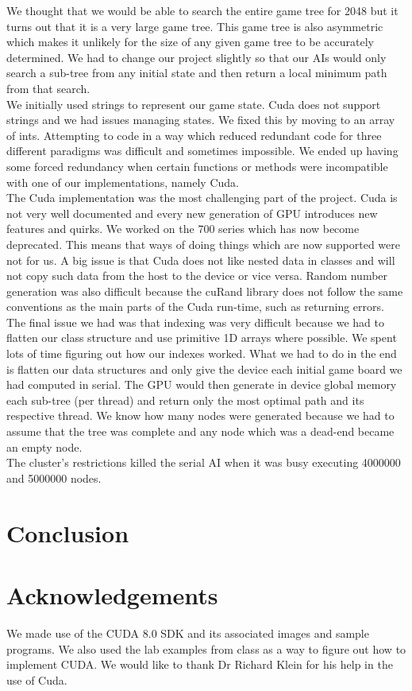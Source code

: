 \documentclass[a4paper]{report}
\begin{document}
We thought that we would be able to search the entire game tree for 2048 but it turns out that it is a very large game tree. This game tree is also asymmetric which makes it unlikely for the size of any given game tree to be accurately determined. We had to change our project slightly so that our AIs would only search a sub-tree from any initial state and then return a local minimum path from that search.\\

We initially used strings to represent our game state. Cuda does not support strings and we had issues managing states. We fixed this by moving to an array of ints.
Attempting to code in a way which reduced redundant code for three different paradigms was difficult and sometimes impossible. We ended up having some forced redundancy when certain functions or methods were incompatible with one of our implementations, namely Cuda.\\

The Cuda implementation was the most challenging part of the project. Cuda is not very well documented and every new generation of GPU introduces new features and quirks. We worked on the 700 series which has now become deprecated. This means that ways of doing things which are now supported were not for us. A big issue is that Cuda does not like nested data in classes and will not copy such data from the host to the device or vice versa. Random number generation was also difficult because the cuRand library does not follow the same conventions as the main parts of the Cuda run-time, such as returning errors. The final issue we had was that indexing was very difficult because we had to flatten our class structure and use primitive 1D arrays where possible. We spent lots of time figuring out how our indexes worked. What we had to do in the end is flatten our data structures and only give the device each initial game board we had computed in serial. The GPU would then generate in device global memory each sub-tree (per thread) and return only the most optimal path and its respective thread. We know how many nodes were generated because we had to assume that the tree was complete and any node which was a dead-end became an empty node.\\

The cluster’s restrictions killed the serial AI when it was busy executing 4000000 and 5000000 nodes.


\section{Conclusion}

\section*{Acknowledgements}
We made use of the CUDA 8.0 SDK and its associated images and sample programs. We also used the lab examples from class as a way to figure out how to implement CUDA. We would like to thank Dr Richard Klein for his help in the use of Cuda.


{}
\end{document}
